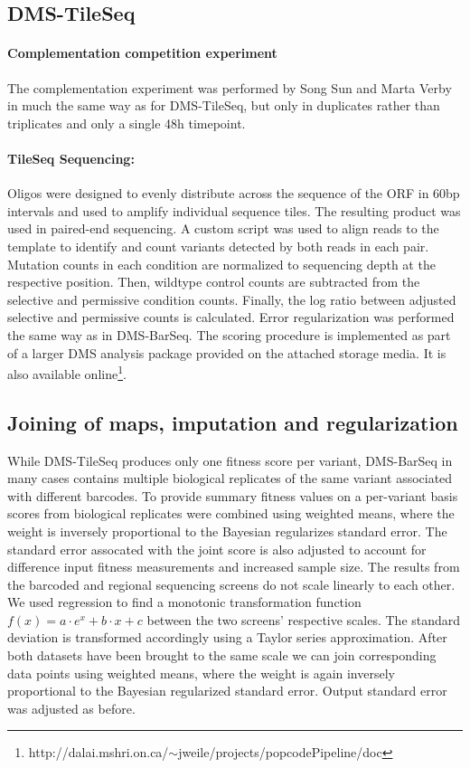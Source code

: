\subsection{DMS-TileSeq}

\paragraph{Complementation competition experiment} 
The complementation experiment was performed by Song Sun and Marta Verby in much the same way as for DMS-TileSeq, but only in duplicates rather than triplicates and only a single 48h timepoint.

\paragraph{TileSeq Sequencing:} Oligos were designed to evenly distribute across the sequence of the  ORF in 60bp intervals and used to amplify individual sequence tiles. The resulting product was used in paired-end sequencing. A custom script was used to align reads to the  template to identify and count variants detected by both reads in each pair. Mutation counts in each condition are normalized to sequencing depth at the respective position. Then, wildtype control counts are subtracted from the selective and permissive condition counts. Finally, the log ratio between adjusted selective and permissive counts is calculated. Error regularization was performed the same way as in DMS-BarSeq. 
The scoring procedure is implemented as part of a larger DMS analysis package provided on the attached storage media. It is also available online\footnote{http://dalai.mshri.on.ca/$\sim$jweile/projects/popcodePipeline/doc}.

\subsection{Joining of maps, imputation and regularization}

While DMS-TileSeq produces only one fitness score per variant, DMS-BarSeq in many cases contains multiple biological replicates of the same variant associated with different barcodes. To provide summary fitness values on a per-variant basis scores from biological replicates were combined using weighted means, where the weight is inversely proportional to the Bayesian regularizes standard error. The standard error assocated with the joint score is also adjusted to account for difference input fitness measurements and increased sample size.
The results from the barcoded and regional sequencing screens do not scale linearly to each other. We used regression to find a monotonic transformation function $f(x) = a \cdot e^x + b \cdot x + c$ between the two screens' respective scales. The standard deviation is transformed accordingly using a Taylor series approximation. After both datasets have been brought to the same scale we can join corresponding data points using weighted means, where the weight is again inversely proportional to the Bayesian regularized standard error. Output standard error was adjusted as before. 

